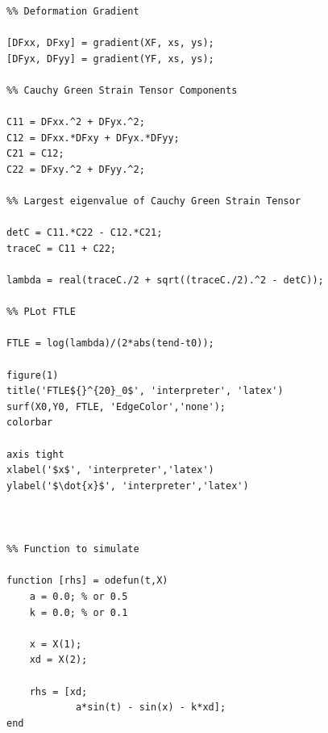 \begin{solution}[2.2]
\begin{verbatim}
%% Deformation Gradient

[DFxx, DFxy] = gradient(XF, xs, ys);
[DFyx, DFyy] = gradient(YF, xs, ys);

%% Cauchy Green Strain Tensor Components

C11 = DFxx.^2 + DFyx.^2;
C12 = DFxx.*DFxy + DFyx.*DFyy;
C21 = C12;
C22 = DFxy.^2 + DFyy.^2;

%% Largest eigenvalue of Cauchy Green Strain Tensor

detC = C11.*C22 - C12.*C21;
traceC = C11 + C22;

lambda = real(traceC./2 + sqrt((traceC./2).^2 - detC));

%% PLot FTLE

FTLE = log(lambda)/(2*abs(tend-t0));

figure(1)
title('FTLE${}^{20}_0$', 'interpreter', 'latex')
surf(X0,Y0, FTLE, 'EdgeColor','none');
colorbar

axis tight
xlabel('$x$', 'interpreter','latex')
ylabel('$\dot{x}$', 'interpreter','latex')



%% Function to simulate

function [rhs] = odefun(t,X)
    a = 0.0; % or 0.5
    k = 0.0; % or 0.1
    
    x = X(1);
    xd = X(2);
    
    rhs = [xd;
            a*sin(t) - sin(x) - k*xd];
end
\end{verbatim}
\end{solution}


